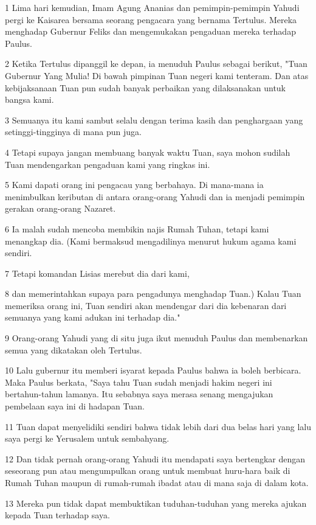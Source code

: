 \par 1 Lima hari kemudian, Imam Agung Ananias dan pemimpin-pemimpin Yahudi pergi ke Kaisarea bersama seorang pengacara yang bernama Tertulus. Mereka menghadap Gubernur Feliks dan mengemukakan pengaduan mereka terhadap Paulus.
\par 2 Ketika Tertulus dipanggil ke depan, ia menuduh Paulus sebagai berikut, "Tuan Gubernur Yang Mulia! Di bawah pimpinan Tuan negeri kami tenteram. Dan atas kebijaksanaan Tuan pun sudah banyak perbaikan yang dilaksanakan untuk bangsa kami.
\par 3 Semuanya itu kami sambut selalu dengan terima kasih dan penghargaan yang setinggi-tingginya di mana pun juga.
\par 4 Tetapi supaya jangan membuang banyak waktu Tuan, saya mohon sudilah Tuan mendengarkan pengaduan kami yang ringkas ini.
\par 5 Kami dapati orang ini pengacau yang berbahaya. Di mana-mana ia menimbulkan keributan di antara orang-orang Yahudi dan ia menjadi pemimpin gerakan orang-orang Nazaret.
\par 6 Ia malah sudah mencoba membikin najis Rumah Tuhan, tetapi kami menangkap dia. (Kami bermaksud mengadilinya menurut hukum agama kami sendiri.
\par 7 Tetapi komandan Lisias merebut dia dari kami,
\par 8 dan memerintahkan supaya para pengadunya menghadap Tuan.) Kalau Tuan memeriksa orang ini, Tuan sendiri akan mendengar dari dia kebenaran dari semuanya yang kami adukan ini terhadap dia."
\par 9 Orang-orang Yahudi yang di situ juga ikut menuduh Paulus dan membenarkan semua yang dikatakan oleh Tertulus.
\par 10 Lalu gubernur itu memberi isyarat kepada Paulus bahwa ia boleh berbicara. Maka Paulus berkata, "Saya tahu Tuan sudah menjadi hakim negeri ini bertahun-tahun lamanya. Itu sebabnya saya merasa senang mengajukan pembelaan saya ini di hadapan Tuan.
\par 11 Tuan dapat menyelidiki sendiri bahwa tidak lebih dari dua belas hari yang lalu saya pergi ke Yerusalem untuk sembahyang.
\par 12 Dan tidak pernah orang-orang Yahudi itu mendapati saya bertengkar dengan seseorang pun atau mengumpulkan orang untuk membuat huru-hara baik di Rumah Tuhan maupun di rumah-rumah ibadat atau di mana saja di dalam kota.
\par 13 Mereka pun tidak dapat membuktikan tuduhan-tuduhan yang mereka ajukan kepada Tuan terhadap saya.
